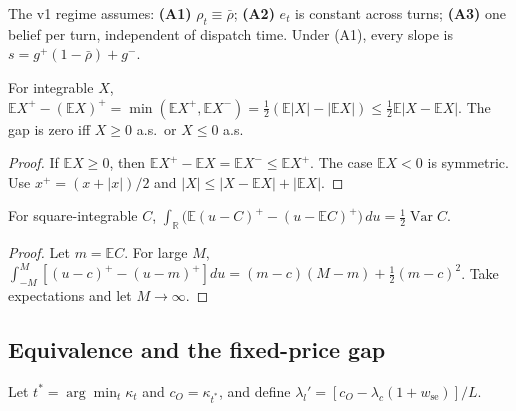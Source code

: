 The v1 regime assumes:
\textbf{(A1)} $\rho_t\equiv\bar\rho$;
\textbf{(A2)} $e_t$ is constant across turns;
\textbf{(A3)} one belief per turn, independent of dispatch time.
Under (A1), every slope is $s=g^{+}(1-\bar\rho)+g^{-}$.

\begin{lemma}\label{lem:J}
For integrable $X$,
$\mathbb E X^{+}-(\mathbb E X)^{+}=\min(\mathbb EX^{+},\mathbb EX^{-})
=\tfrac12(\mathbb E|X|-|\mathbb EX|)\le\tfrac12\mathbb E|X-\mathbb EX|$.
The gap is zero iff $X\ge0$ a.s.\ or $X\le0$ a.s.
\end{lemma}
\begin{proof}
If $\mathbb EX\ge0$, then $\mathbb EX^{+}-\mathbb EX=\mathbb EX^{-}\le\mathbb EX^{+}$.
The case $\mathbb EX<0$ is symmetric. Use $x^{+}=(x+|x|)/2$ and
$|X|\le|X-\mathbb EX|+|\mathbb EX|$.
\end{proof}

\begin{lemma}\label{lem:I}
For square-integrable $C$,
$\int_{\mathbb R}\big(\mathbb E(u-C)^{+}-(u-\mathbb EC)^{+}\big)\,du=\tfrac12\operatorname{Var}C$.
\end{lemma}
\begin{proof}
Let $m=\mathbb EC$. For large $M$,
$\int_{-M}^{M}[(u-c)^{+}-(u-m)^{+}]du=(m-c)(M-m)+\tfrac12(m-c)^2$.
Take expectations and let $M\to\infty$.
\end{proof}

\subsection{Equivalence and the fixed-price gap}
Let $t^{*}=\arg\min_t\kappa_t$ and $c_O=\kappa_{t^{*}}$, and define
$\lambda_l'=[c_O-\lambda_c(1+w_{\mathrm{se}})]/L$.

